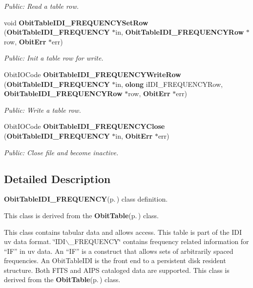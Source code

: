 \begin{CompactItemize}
\begin{CompactList}\small\item\em Public: Read a table row. \item\end{CompactList}\item 
void {\bf Obit\-Table\-IDI\_\-FREQUENCYSet\-Row} ({\bf Obit\-Table\-IDI\_\-FREQUENCY} $\ast$in, {\bf Obit\-Table\-IDI\_\-FREQUENCYRow} $\ast$row, {\bf Obit\-Err} $\ast$err)
\begin{CompactList}\small\item\em Public: Init a table row for write. \item\end{CompactList}\item 
Obit\-IOCode {\bf Obit\-Table\-IDI\_\-FREQUENCYWrite\-Row} ({\bf Obit\-Table\-IDI\_\-FREQUENCY} $\ast$in, {\bf olong} i\-IDI\_\-FREQUENCYRow, {\bf Obit\-Table\-IDI\_\-FREQUENCYRow} $\ast$row, {\bf Obit\-Err} $\ast$err)
\begin{CompactList}\small\item\em Public: Write a table row. \item\end{CompactList}\item 
Obit\-IOCode {\bf Obit\-Table\-IDI\_\-FREQUENCYClose} ({\bf Obit\-Table\-IDI\_\-FREQUENCY} $\ast$in, {\bf Obit\-Err} $\ast$err)
\begin{CompactList}\small\item\em Public: Close file and become inactive. \item\end{CompactList}\end{CompactItemize}


\subsection{Detailed Description}
{\bf Obit\-Table\-IDI\_\-FREQUENCY}{\rm (p.\,\pageref{structObitTableIDI__FREQUENCY})} class definition. 

This class is derived from the {\bf Obit\-Table}{\rm (p.\,\pageref{structObitTable})} class.

This class contains tabular data and allows access. This table is part of the IDI uv data format. \char`\"{}IDI$\backslash$\_\-FREQUENCY\char`\"{} contains frequency related information for ``IF'' in uv data. An ``IF'' is a construct that allows sets of arbitrarily spaced frequencies. An Obit\-Table\-IDI is the front end to a persistent disk resident structure. Both FITS and AIPS cataloged data are supported. This class is derived from the {\bf Obit\-Table}{\rm (p.\,\pageref{structObitTable})} class.

